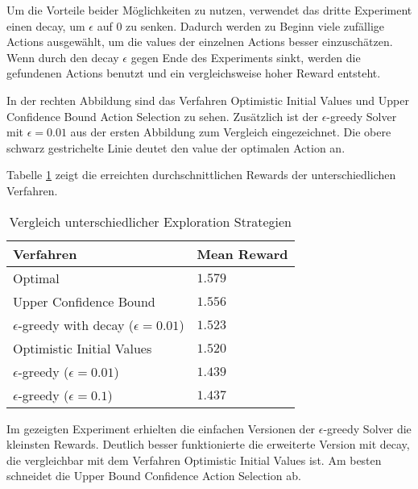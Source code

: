 \documentclass[11pt]{scrartcl}
\begin{document}
Um die Vorteile beider Möglichkeiten zu nutzen, verwendet das dritte Experiment einen
decay, um $\epsilon$ auf $0$ zu senken. Dadurch werden zu Beginn viele zufällige Actions
ausgewählt, um die values der einzelnen Actions besser einzuschätzen. Wenn durch den decay
$\epsilon$ gegen Ende des Experiments sinkt, werden die gefundenen Actions benutzt und ein
vergleichsweise hoher Reward entsteht.

In der rechten Abbildung sind das Verfahren Optimistic Initial Values und Upper Confidence
Bound Action Selection zu sehen. Zusätzlich ist der $\epsilon$-greedy Solver mit
$\epsilon=0.01$ aus der ersten Abbildung zum Vergleich eingezeichnet. Die obere schwarz
gestrichelte Linie deutet den value der optimalen Action an.

Tabelle \ref{tab:explorationstrategies} zeigt die erreichten durchschnittlichen Rewards
der unterschiedlichen Verfahren.

\begin{table}[ht]
  \begin{center}
    \begin{tabular}{l | l}
      \textbf{Verfahren} & \textbf{Mean Reward} \\
      \hline
      Optimal & $1.579$\\
      Upper Confidence Bound & $1.556$ \\
      $\epsilon$-greedy with decay ($\epsilon=0.01$) & $1.523$ \\
      Optimistic Initial Values & $1.520$ \\
      $\epsilon$-greedy ($\epsilon=0.01$) & $1.439$ \\
      $\epsilon$-greedy ($\epsilon=0.1$) & $1.437$ \\
    \end{tabular}

    \caption[ExplorationStrategies]{Vergleich unterschiedlicher Exploration Strategien}
    \label{tab:explorationstrategies}
  \end{center}
\end{table}

\noindent
Im gezeigten Experiment erhielten die einfachen Versionen der $\epsilon$-greedy Solver die
kleinsten Rewards. Deutlich besser funktionierte die erweiterte Version mit decay, die
vergleichbar mit dem Verfahren Optimistic Initial Values ist. Am besten schneidet die
Upper Bound Confidence Action Selection ab.


\newpage
\end{document}
